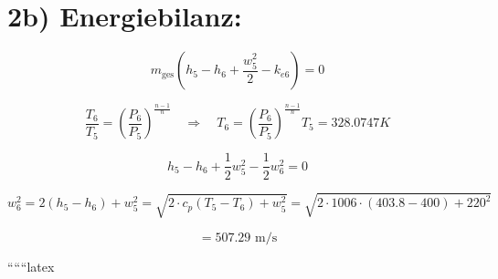 \section*{2b) Energiebilanz:}

\[
m_{\text{ges}} \left( h_5 - h_6 + \frac{w_5^2}{2} - k_{e6} \right) = 0
\]

\[
\frac{T_6}{T_5} = \left( \frac{P_6}{P_5} \right)^{\frac{n-1}{n}} \quad \Rightarrow \quad T_6 = \left( \frac{P_6}{P_5} \right)^{\frac{n-1}{n}} T_5 = 328.0747 K
\]

\[
h_5 - h_6 + \frac{1}{2} w_5^2 - \frac{1}{2} w_6^2 = 0
\]

\[
w_6^2 = 2 \left( h_5 - h_6 \right) + w_5^2 = \sqrt{2 \cdot c_p \left( T_5 - T_6 \right) + w_5^2} = \sqrt{2 \cdot 1006 \cdot (403.8 - 400) + 220^2}
\]

\[
= 507.29 \text{ m/s}
\]

``````latex